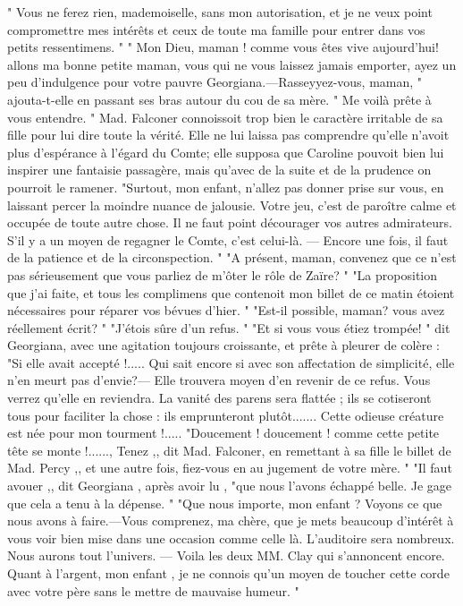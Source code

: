 " Vous ne ferez rien, mademoiselle, sans mon autorisation, et je ne veux point compromettre mes intérêts et ceux de toute ma famille pour entrer dans vos petits ressentimens. "
" Mon Dieu, maman ! comme vous êtes vive aujourd'hui! allons ma bonne petite maman, vous qui ne vous laissez jamais emporter, ayez un peu d'indulgence pour votre pauvre Georgiana.—Rasseyyez-vous, maman, " ajouta-t-elle en passant ses bras autour du cou de sa mère. " Me voilà prête à vous entendre. "\setcounter{page}{275} Mad. Falconer connoissoit trop bien le caractère irritable de sa fille pour lui dire toute la vérité. Elle ne lui laissa pas comprendre qu’elle n’avoit plus d’espérance à l’égard du Comte; elle supposa que Caroline pouvoit bien lui inspirer une fantaisie passagère, mais qu’avec de la suite et de la prudence on pourroit le ramener. "Surtout, mon enfant, n’allez pas donner prise sur vous, en laissant percer la moindre nuance de jalousie. Votre jeu, c’est de paroître calme et occupée de toute autre chose. Il ne faut point décourager vos autres admirateurs. S’il y a un moyen de regagner le Comte, c’est celui-là. — Encore une fois, il faut de la patience et de la circonspection. "
"A présent, maman, convenez que ce n’est pas sérieusement que vous parliez de m’ôter le rôle de Zaïre? "
"La proposition que j’ai faite, et tous les complimens que contenoit mon billet de ce matin étoient nécessaires pour réparer vos bévues d’hier. "
"Est-il possible, maman? vous avez réellement écrit? "
"J’étois sûre d’un refus. "
"Et si vous vous étiez trompée! " dit Georgiana, avec une agitation toujours croissante, et prête à pleurer de colère : "Si elle\setcounter{page}{276} avait accepté !..... Qui sait encore si avec son affectation de simplicité, elle n'en meurt pas d'envie?— Elle trouvera moyen d'en revenir de ce refus. Vous verrez qu'elle en reviendra. La vanité des parens sera flattée ; ils se cotiseront tous pour faciliter la chose : ils emprunteront plutôt....... Cette odieuse créature est née pour mon tourment !.....
"Doucement ! doucement ! comme cette petite tête se monte !......, Tenez ,, dit Mad. Falconer, en remettant à sa fille le billet de Mad. Percy ,, et une autre fois, fiez-vous en au jugement de votre mère. "
"Il faut avouer ,, dit Georgiana , après avoir lu , "que nous l'avons échappé belle. Je gage que cela a tenu à la dépense. "
"Que nous importe, mon enfant ? Voyons ce que nous avons à faire.—Vous comprenez, ma chère, que je mets beaucoup d'intérêt à vous voir bien mise dans une occasion comme celle là. L'auditoire sera nombreux. Nous aurons tout l'univers. — Voila les deux MM. Clay qui s'annoncent encore. Quant à l'argent, mon enfant , je ne connois qu'un moyen de toucher cette corde avec votre père sans le mettre de mauvaise humeur. "
